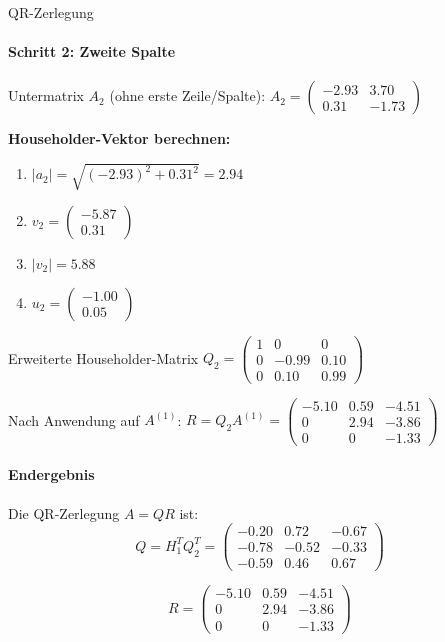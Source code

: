 \begin{example2}[breakable]{QR-Zerlegung}
\paragraph{Schritt 2: Zweite Spalte}
Untermatrix $A_2$ (ohne erste Zeile/Spalte):
$A_2 = \begin{pmatrix} -2.93 & 3.70\\ 0.31 & -1.73 \end{pmatrix}$

\textbf{Householder-Vektor berechnen:}
\vspace{1mm}
\begin{enumerate}
    \item $|a_2| = \sqrt{(-2.93)^2 + 0.31^2} = 2.94$
    \item $v_2 = \begin{pmatrix} -5.87\\ 0.31 \end{pmatrix}$
    \item $|v_2| = 5.88$
    \item $u_2 = \begin{pmatrix} -1.00\\ 0.05 \end{pmatrix}$
\end{enumerate}

Erweiterte Householder-Matrix $Q_2 = \begin{pmatrix}
1 & 0 & 0\\
0 & -0.99 & 0.10\\
0 & 0.10 & 0.99
\end{pmatrix}$

Nach Anwendung auf $A^{(1)}$:
$R = Q_2A^{(1)} = \begin{pmatrix}
-5.10 & 0.59 & -4.51\\
0 & 2.94 & -3.86\\
0 & 0 & -1.33
\end{pmatrix}$

\paragraph{Endergebnis}
Die QR-Zerlegung $A = QR$ ist:
$$Q = H_1^TQ_2^T = \begin{pmatrix}
-0.20 & 0.72 & -0.67\\
-0.78 & -0.52 & -0.33\\
-0.59 & 0.46 & 0.67
\end{pmatrix}$$

$$R = \begin{pmatrix}
-5.10 & 0.59 & -4.51\\
0 & 2.94 & -3.86\\
0 & 0 & -1.33
\end{pmatrix}$$


\end{example2}

